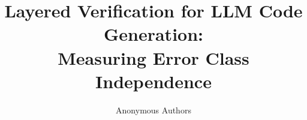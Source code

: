 \documentclass[letterpaper]{article}
\title{Layered Verification for LLM Code Generation: \\
Measuring Error Class Independence}
\author{Anonymous Authors}
\date{}
\begin{document}
\maketitle

\begin{abstract}

\end{abstract}











\end{document}
